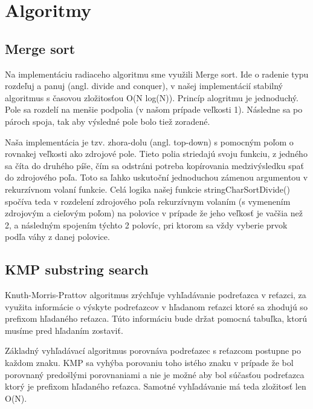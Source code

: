 \documentclass[12pt,a4paper,titlepage,final]{article}
\begin{document}
\section{Algoritmy} \label{Algoritmy}

\subsection{Merge sort}
Na implementáciu radiaceho algoritmu sme využili Merge sort. Ide o radenie
 typu rozdeľuj a panuj (angl. divide and conquer), v našej implementácií stabilný
 algoritmus s časovou zložitosťou O(N log(N)). Princíp alogritmu je jednoduchý.
 Pole sa rozdelí na menšie podpolia (v našom prípade veľkosti 1). Následne sa
 po pároch spoja, tak aby výsledné pole bolo tiež zoradené.

Naša implementácia je tzv. zhora-dolu (angl. top-down) s pomocným poľom o
 rovnakej veľkosti ako zdrojové pole. Tieto polia striedajú svoju funkciu, z
 jedného sa číta do druhého píše, čím sa odstráni potreba kopírovania
 medzivýsledku spať do zdrojového poľa. Toto sa ľahko uskutoční jednoduchou
 zámenou argumentou v rekurzívnom volaní funkcie. Celá logika našej funkcie
 stringCharSortDivide() spočíva teda v rozdelení zdrojového poľa rekurzívnym
 volaním (s vymenením zdrojovým a cieľovým poľom) na polovice v prípade že jeho
 veľkosť je vačšia než 2, a následným spojením týchto 2 polovíc, pri ktorom sa
 vždy vyberie prvok podľa váhy z danej polovice.


\subsection{KMP substring search}
Knuth-Morris-Prattov algoritmus zrýchľuje vyhľadávanie podreťazca v reťazci, za
 využita informácie o výskyte podreťazcov v hľadanom reťazci ktoré sa
 zhodujú so prefixom hľadaného reťazca. Túto informáciu bude držat pomocná
 tabuľka, ktorú musíme pred hľadaním zostaviť.

Základný vyhľadávací algoritmus porovnáva podreťazec s reťazcom postupne po
 každom znaku. KMP sa vyhýba porovaniu toho istého znaku v prípade že bol
 porovnaný predošlými porovnaniami a nie je možné aby bol súčasťou podreťazca
 ktorý je prefixom hľadaného reťazca. Samotné vyhľadávanie má teda zložitosť
 len O(N).
\end{document}

